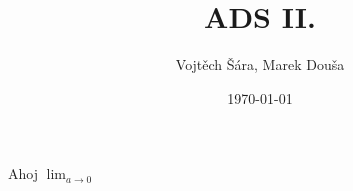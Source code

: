 \documentclass{article}
\title{ADS II.}
\date{\today}
\author{Vojtěch Šára, Marek Douša}
\begin{document}
\maketitle
Ahoj $\lim_{a \rightarrow 0}$ 
\end{document}

